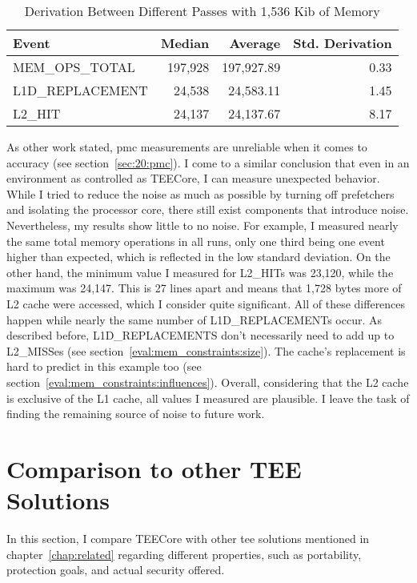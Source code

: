 \begin{table}[ht]
  \centering
  \begin{tabular}{ |l|r|r|r| }
    \hline
    Event            & Median   & Average     & Std. Derivation \\
    \hline
    MEM\_OPS\_TOTAL  & 197,928  & 197,927.89  & 0.33            \\
    L1D\_REPLACEMENT & 24,538   & 24,583.11   & 1.45            \\
    L2\_HIT          & 24,137   & 24,137.67   & 8.17            \\
    \hline
  \end{tabular}
  \caption{Derivation Between Different Passes with 1,536 Kib of Memory}
  \label{50:tab:ping_base}
\end{table}

As other work stated, \gls{pmc} measurements are unreliable when it comes to
accuracy (see section~\ref{sec:20:pmc}). I come to a similar conclusion that
even in an environment as controlled as TEECore, I can measure unexpected
behavior. While I tried to reduce the noise as much as possible by turning off
prefetchers and isolating the processor core, there still exist components that
introduce noise. Nevertheless, my results show little to no noise. For example,
I measured nearly the same total memory operations in all runs, only one third
being one event higher than expected, which is reflected in the low standard
deviation. On the other hand, the minimum value I measured for L2\_HITs was
23,120, while the maximum was 24,147. This is 27 lines apart and means that
1,728 bytes more of L2 cache were accessed, which I consider quite significant.
All of these differences happen while nearly the same number of
L1D\_REPLACEMENTs occur. As described before, L1D\_REPLACEMENTS don't
necessarily need to add up to L2\_MISSes (see
section~\ref{eval:mem_constraints:size}). The cache's replacement is hard to
predict in this example too (see section~\ref{eval:mem_constraints:influences}).
Overall, considering that the L2 cache is exclusive of the L1 cache, all values
I measured are plausible. I leave the task of finding the remaining source of
noise to future work.

\section{Comparison to other TEE Solutions}
\label{eval:compare}
In this section, I compare TEECore with other \gls{tee} solutions mentioned in
chapter~\ref{chap:related} regarding different properties, such as portability,
protection goals, and actual security offered.

